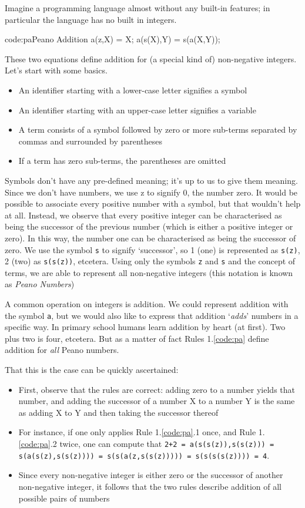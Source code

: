 \documentclass[11pt,twoside]{memoir}
\def\E{\emph} %
\def\T{\texttt}
\begin{document}
Imagine a programming language almost without any built-in features; in particular the language has no built in integers.

\begin{introcode}{code:pa}{Peano Addition}
a(z,X) = X;
a(s(X),Y) = s(a(X,Y));
\end{introcode}

These two equations define addition for (a special kind of) non-negative integers. Let's start with some basics.


\begin{itemize}
\item An identifier starting with a lower-case letter signifies a symbol
\item An identifier starting with an upper-case letter signifies a variable
\item A term consists of a symbol followed by zero or more sub-terms separated by commas and surrounded by parentheses
\item If a term has zero sub-terms, the parentheses are omitted
\end{itemize}

Symbols don't have any pre-defined meaning; it's up to us to give them meaning. Since we don't have numbers, we use z to signify 0, the number zero. It would be possible to associate every positive number with a symbol, but that wouldn't help at all. Instead, we observe that every positive integer can be characterised as being the successor of the previous number (which is either a positive integer or zero). In this way, the number one can be characterised as being the successor of zero. We use the symbol \T{s} to signify `successor', so 1 (one) is represented as \T{s(z)}, 2 (two) as \T{s(s(z))}, etcetera. Using only the symbols \T{z} and \T{s} and the concept of terms, we are able to represent all non-negative integers (this notation is known as \E{Peano Numbers})

A common operation on integers is addition. We could represent addition with the symbol \T{a}, but we would also like to express that addition `\E{adds}' numbers in a specific way. In primary school humans learn addition by heart (at first). Two plus two is four, etcetera. But as a matter of fact Rules 1.\ref{code:pa} define addition for \E{all} Peano numbers.

That this is the case can be quickly ascertained:

\begin{itemize}
\item First, observe that the rules are correct: adding zero to a number yields that number, and adding the successor of a number X to a number Y is the same as adding X to Y and then taking the successor thereof
\item For instance, if one only applies Rule 1.\ref{code:pa}.1 once, and Rule 1.\ref{code:pa}.2 twice, one can compute that \T{2+2 = a(s(s(z)),s(s(z))) = s(a(s(z),s(s(z)))) = s(s(a(z,s(s(z))))) = s(s(s(s(z)))) = 4}. 
\item Since every non-negative integer is either zero or the successor of another non-negative integer, it follows that the two rules describe addition of all possible pairs of numbers
\end{itemize}
\end{document}
